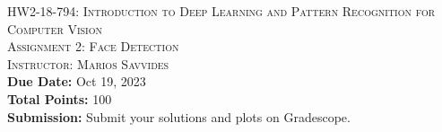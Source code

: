 \documentclass[11pt,addpoints,answers]{exam}
\begin{document}
\begin{center}
    \textsc{\LARGE HW2-18-794: Introduction to Deep Learning and Pattern Recognition for Computer Vision} \\
    \vspace{1em}
    \textsc{\large Assignment 2: Face Detection} \\
    \vspace{0.5em}
    \textsc{\large Instructor: Marios Savvides} \\
    \vspace{0.5em}
    \textbf{Due Date:} Oct 19, 2023 \\
    \vspace{0.5em}
    \textbf{Total Points:} 100 \\
    \vspace{0.5em}
    \textbf{Submission:} Submit your solutions and plots on Gradescope.
\end{center}
\end{document}
